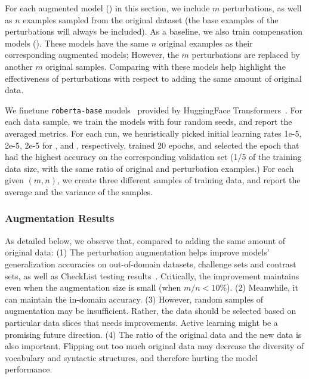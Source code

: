 For each augmented model (\maug) in this section, we include $m$ perturbations, as well as $n$ examples sampled from the original dataset (the base examples of the perturbations will always be included).
As a baseline, we also train compensation models (\mcomp).
These models have the same $n$ original examples as their corresponding augmented models; However, the $m$ perturbations are replaced by another $m$ original samples.
Comparing with these models help highlight the effectiveness of perturbations with respect to adding the same amount of original data. 

We finetune \texttt{roberta-base} models~\cite{liu2019roberta} provided by HuggingFace Transformers~\cite{Wolf2019HuggingFacesTS}.
For each data sample, we train the models with four random seeds, and report the averaged metrics. 
For each run, we heuristically picked initial learning rates 1e-5, 2e-5, 2e-5 for \sst, \nli and \qqp, respectively, trained 20 epochs, and selected the epoch that had the highest accuracy on the corresponding validation set (1/5 of the training data size, with the same ratio of original and perturbation examples.)
For each given $(m,n)$, we create three different samples of training data, and report the average and the variance of the samples. 


\subsubsection{Augmentation Results}
As detailed below, we observe that, compared to adding the same amount of original data: 
(1) The perturbation augmentation helps improve models' generalization accuracies on out-of-domain datasets, challenge sets and contrast sets, as well as CheckList testing results~\cite{checklist:acl20}.
Critically, the improvement maintains even when the augmentation size is small (\eg when $m/n<10\%$).
(2) Meanwhile, it can maintain the in-domain accuracy.
(3) However, random samples of augmentation may be insufficient. Rather, the data should be selected based on particular data slices that needs improvements. 
Active learning might be a promising future direction.
(4) The ratio of the original data and the new data is also important. Flipping out too much original data may decrease the diversity of vocabulary and syntactic structures, and therefore hurting the model performance.


